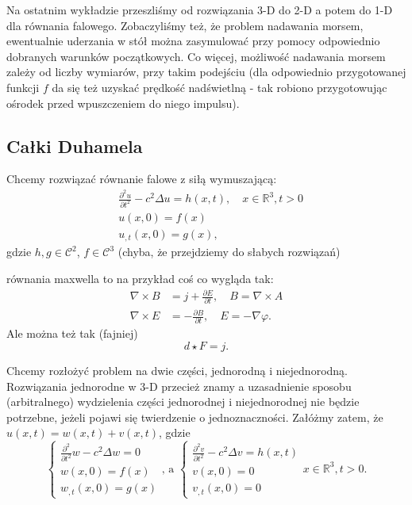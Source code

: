 \documentclass[../main.tex]{subfiles}
\begin{document}
		Na ostatnim wykładzie przeszliśmy od rozwiązania 3-D do 2-D a potem do 1-D dla równania falowego.
		Zobaczyliśmy też, że problem nadawania morsem, ewentualnie uderzania w stół można zasymulować przy pomocy odpowiednio dobranych warunków początkowych.
		Co więcej, możliwość nadawania morsem zależy od liczby wymiarów, przy takim podejściu (dla odpowiednio przygotowanej funkcji $f$ da się też uzyskać prędkość nadświetlną - tak robiono przygotowując ośrodek przed wpuszczeniem do niego impulsu).
\subsection{Całki Duhamela}
Chcemy rozwiązać równanie falowe z siłą wymuszającą:
\begin{align*}
		&\frac{\partial ^2 u}{\partial t^2} -c^2 \Delta u = h(x,t),\quad x\in \mathbb{R}^3, t>0\\
		&u(x,0) = f(x)\\
		&u_{,t}(x,0) = g(x)
,\end{align*}
gdzie $h,g \in \mathcal{C^2}$, $f\in \mathcal{C}^3$ (chyba, że przejdziemy do słabych rozwiązań)
\begin{przyklad}
		równania maxwella to na przykład coś co wygląda tak:
		\begin{align*}
				\nabla \times B &= j + \frac{\partial E}{\partial t},\quad B = \nabla\times A\\
				\nabla \times E &= - \frac{\partial B}{\partial t} ,\quad E = - \nabla \varphi
		.\end{align*}
		Ale można też tak (fajniej)
		\[
		d\star F = j
		.\]
\end{przyklad}
\begin{tw}
Chcemy rozłożyć problem na dwie części, jednorodną i niejednorodną. Rozwiązania jednorodne w 3-D przecież znamy a uzasadnienie sposobu (arbitralnego) wydzielenia części jednorodnej i niejednorodnej nie będzie potrzebne, jeżeli pojawi się twierdzenie o jednoznaczności. Załóżmy zatem, że $u(x,t) = w(x,t) + v(x,t)$, gdzie
\[
\begin{cases}
		\frac{\partial ^2 }{\partial t^2} w - c^2\Delta w = 0\\
		w(x,0) = f(x)\\
		w_{,t}(x,0) = g(x)
\end{cases}
\text{, a }
\begin{cases}
		\frac{\partial ^2 v}{\partial t^2} - c^2 \Delta v = h(x,t)\\
		v(x,0) = 0\\
		v_{,t}(x,0) = 0
\end{cases}
x\in\mathbb{R}^3,t>0
.\]
\end{tw}
\end{document}
